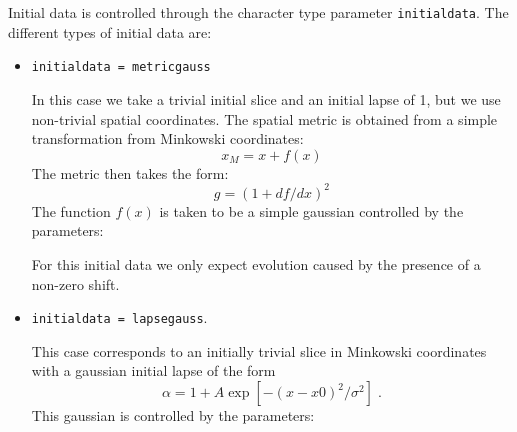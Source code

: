 \documentclass[12pt]{article}
\begin{document}
Initial data is controlled through the character type parameter
\texttt{initialdata}.  The different types of initial data are:

\begin{itemize}

\item \texttt{initialdata = metricgauss}

In this case we take a trivial initial slice and an initial lapse of
1, but we use non-trivial spatial coordinates.  The spatial metric is
obtained from a simple transformation from Minkowski coordinates:
\begin{equation}
x_M = x + f(x)
\end{equation}
The metric then takes the form:
\begin{equation}
g = (1 + df/dx)^2
\end{equation}
The function $f(x)$ is taken to be a simple gaussian controlled by the
parameters:


For this initial data we only expect evolution caused by the presence
of a non-zero shift.


\item \texttt{initialdata = lapsegauss}.

This case corresponds to an initially trivial slice in Minkowski
coordinates with a gaussian initial lapse of the form
\begin{equation}
\alpha = 1 + A \exp \left[ - \left( x - x0 \right)^2 / \sigma^2 \right] \; .
\end{equation}
This gaussian is controlled by the parameters:

\end{itemize}
\end{document}
